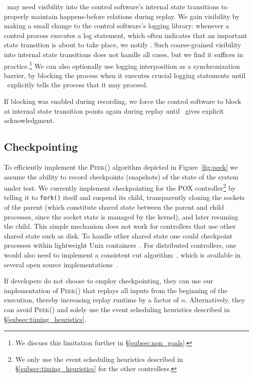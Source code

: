 \projectname~may need visibility into the control software's internal state
transitions to properly maintain happens-before relations during replay. We
gain visibility by making a
small change to the control software's logging library: whenever a control process executes a log
statement, which often indicates that an important state transition is about to take
place, we notify \projectname. Such coarse-grained visibility into internal
state transitions does not handle all cases, but we find it suffices in practice.\footnote{We discuss this limitation further in \S\ref{subsec:non_goals}.}
We can also optionally use
logging interposition as a
synchronization barrier, by blocking the process when it executes crucial logging statements
until \projectname~explicitly tells the process that it may proceed.

If blocking was enabled
during recording, we force the control software to block at internal state
transition points again during replay
until \projectname~gives explicit acknowledgment.

\subsection{Checkpointing}
\label{subsec:snapshotting}

To efficiently implement the {\textsc{Peek()}} algorithm depicted in
Figure~\ref{fig:peek} we assume the ability to record checkpoints (snapshots) of the state of the
system under test. We currently implement checkpointing for the POX
controller\footnote{We only use the event scheduling heuristics described in
\S\ref{subsec:timing_heuristics} for the other controllers.} by telling it to \verb=fork()= itself and suspend its child,
transparently cloning the sockets of the parent
(which constitute shared state between the parent and child processes,
since the socket state is managed by the kernel),
and later resuming the child. This simple mechanism does
not work for controllers that use other shared state such as disk.
To handle other shared state one could checkpoint processes within
lightweight Unix containers~\cite{lxc}. For distributed controllers, one
would also need to implement a consistent cut
algorithm~\cite{Chandy:1985:DSD:214451.214456}, which is available in several open source
implementations~\cite{ansel2009dmtcp}.

If developers do not choose to employ checkpointing,
they can use our implementation of {\textsc{Peek()}} that replays all inputs from
the beginning of the execution, thereby increasing replay runtime by
a factor of $n$. Alternatively, they can
avoid {\textsc{Peek()}} and solely use the event scheduling heuristics described in \S\ref{subsec:timing_heuristics}.

